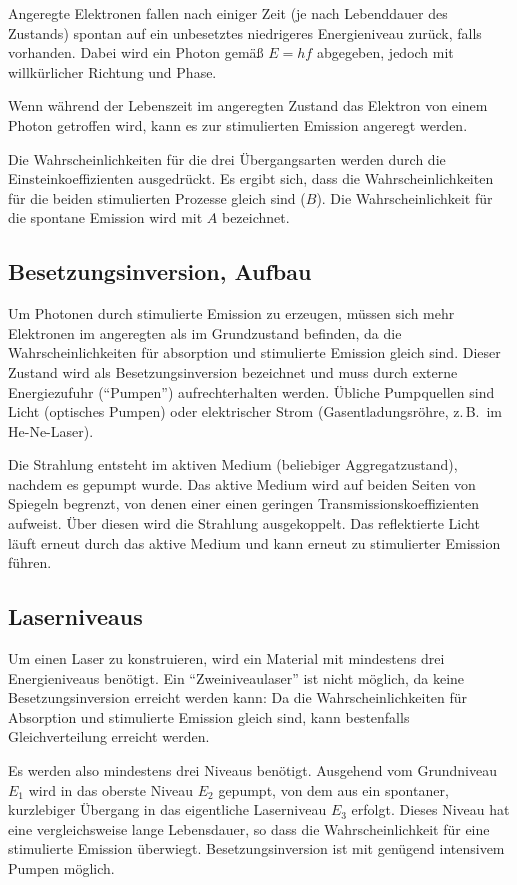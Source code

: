 \documentclass[a4paper]{scrartcl}
\begin{document}
Angeregte Elektronen fallen nach einiger Zeit (je nach Lebenddauer des Zustands) spontan auf ein unbesetztes niedrigeres Energieniveau zurück, falls vorhanden. Dabei wird ein Photon gemäß $E = hf$ abgegeben, jedoch mit willkürlicher Richtung und Phase.

Wenn während der Lebenszeit im angeregten Zustand das Elektron von einem Photon getroffen wird, kann es zur stimulierten Emission angeregt werden.

Die Wahrscheinlichkeiten für die drei Übergangsarten werden durch die Einsteinkoeffizienten ausgedrückt. Es ergibt sich, dass die Wahrscheinlichkeiten für die beiden stimulierten Prozesse gleich sind ($B$). Die Wahrscheinlichkeit für die spontane Emission wird mit $A$ bezeichnet.

\subsection{Besetzungsinversion, Aufbau}
Um Photonen durch stimulierte Emission zu erzeugen, müssen sich mehr Elektronen im angeregten als im Grundzustand befinden, da die Wahrscheinlichkeiten für absorption und stimulierte Emission gleich sind. Dieser Zustand wird als Besetzungsinversion bezeichnet und muss durch externe Energiezufuhr ("`Pumpen"') aufrechterhalten werden. Übliche Pumpquellen sind Licht (optisches Pumpen) oder elektrischer Strom (Gasentladungsröhre, z.\,B.\, im He-Ne-Laser).

Die Strahlung entsteht im aktiven Medium (beliebiger Aggregatzustand), nachdem es gepumpt wurde. Das aktive Medium wird auf beiden Seiten von Spiegeln begrenzt, von denen einer einen geringen Transmissionskoeffizienten aufweist. Über diesen wird die Strahlung ausgekoppelt. Das reflektierte Licht läuft erneut durch das aktive Medium und kann erneut zu stimulierter Emission führen.

\subsection{Laserniveaus}
Um einen Laser zu konstruieren, wird ein Material mit mindestens drei Energieniveaus benötigt. Ein "`Zweiniveaulaser"' ist nicht möglich, da keine Besetzungsinversion erreicht werden kann: Da die Wahrscheinlichkeiten für Absorption und stimulierte Emission gleich sind, kann bestenfalls Gleichverteilung erreicht werden.

Es werden also mindestens drei Niveaus benötigt. Ausgehend vom Grundniveau $E_1$ wird in das oberste Niveau $E_2$ gepumpt, von dem aus ein spontaner, kurzlebiger Übergang in das eigentliche Laserniveau $E_3$ erfolgt. Dieses Niveau hat eine vergleichsweise lange Lebensdauer, so dass die Wahrscheinlichkeit für eine stimulierte Emission überwiegt. Besetzungsinversion ist mit genügend intensivem Pumpen möglich.
\end{document}
